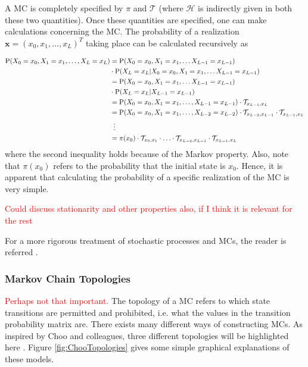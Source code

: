 \documentclass{article}
\begin{document}
A MC is completely specified by $\pi$ and $\mathcal{T}$ (where $\mathcal{H}$ is indirectly given in both these two quantities). Once these quantities are specified, one can make calculations concerning the MC. The probability of a realization $\mathbf{x} = (x_0, x_1, \ldots, x_L)^T$ taking place can be calculated recursively as 

\begin{align*}
    \text{P}(X_0 = x_0, X_1 = x_1, \ldots, X_L = x_L) &= \text{P}(X_0 = x_0, X_1 = x_1, \ldots X_{L-1} = x_{L-1})\\ 
    &\cdot\text{P}(X_L = x_L|X_0 = x_0, X_1 = x_1, \ldots X_{L-1} = x_{L-1}) \\ 
    &= \text{P}(X_0 = x_0, X_1 = x_1, \ldots X_{L-1} = x_{L-1})\\&\cdot\text{P}(X_L = x_L|X_{L-1} = x_{L-1}) \\ 
    &= \text{P}(X_0 = x_0, X_1 = x_1, \ldots, X_{L-1} = x_{L-1})\cdot\mathcal{T}_{x_{L-1}, x_L} \\ 
    &= \text{P}(X_0 = x_0, X_1 = x_1, \ldots, X_{L-2} = x_{L-2})\cdot \mathcal{T}_{x_{L-2}, x_{L-1}}\cdot\mathcal{T}_{x_{L-1}, x_L} \\ & \hspace{0.5em}\vdots \\ &= \pi(x_0)\cdot\mathcal{T}_{x_0,x_1}\cdot \ldots \cdot \mathcal{T}_{x_{L-2}, x_{L-1}} \cdot\mathcal{T}_{x_{L-1}, x_L}
\end{align*}
where the second inequality holds because of the Markov property. Also, note that $\pi(x_0)$ refers to the probability that the initial state is $x_0$. Hence, it is apparent that calculating the probability of a specific realization of the MC is very simple. 

\textcolor{red}{Could discuss stationarity and other properties also, if I think it is relevant for the rest}

For a more rigorous treatment of stochastic processes and MCs, the reader is referred \cite{Pinsky2011}.

\subsubsection{Markov Chain Topologies}
\textcolor{red}{Perhaps not that important.}
The topology of a MC refers to which state transitions are permitted and prohibited, i.e. what the values in the transition probability matrix are. There exists many different ways of constructing MCs. As inspired by Choo and colleagues, three different topologies will be highlighted here \cite{Choo2004}. Figure \ref{fig:ChooTopologies} gives some simple graphical explanations of these models. 
\end{document}
